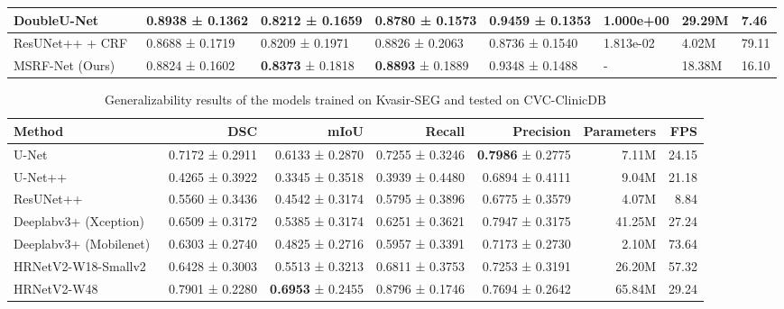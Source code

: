 \documentclass[journal,twoside,web]{IEEEtran}
\begin{document}
\begin{table*}[!t]
\begin{tabular}{@{}l|l|l|l|l|l|l|l@{}}
DoubleU-Net~\cite{jha2020doubleu} &{\textbf{0.8938}} ± 0.1362 & {0.8212} ± {0.1659} & 0.8780 ± {0.1573} & {0.9459} ± {0.1353} & 1.000e+00 & 29.29M & {7.46}  \\ \hline

ResUNet++ + CRF~\cite{jha2021comprehensive}& 0.8688 ± 0.1719 & 0.8209 ± 0.1971 & 0.8826 ± 0.2063 & 0.8736 ± 0.1540 & 1.813e-02 & 4.02M & 79.11 \\ \hline
MSRF-Net (Ours) & 0.8824 ± 0.1602 & \textbf{0.8373} ± 0.1818 &\textbf{0.8893} ± 0.1889 & 0.9348 ± 0.1488 & - & 18.38M & 16.10 \\ \hline   
\bottomrule
\end{tabular}
\vspace{-5mm}
\end{table*}

\begin{table*} [!t]
\centering
\scriptsize
\caption{Generalizability results of the models trained on Kvasir-SEG and tested on  CVC-ClinicDB}
\label{tab:generalizationkvasir}
\begin{tabular}{l|r|r|r|r|r|r}
\toprule
\textbf{Method} & \textbf{DSC} & \textbf{mIoU}& \textbf{Recall} & \textbf{Precision} & \textbf{Parameters} & \textbf{FPS} \\\hline
U-Net~\cite{ronneberger2015u} & 0.7172 ± 0.2911 & 0.6133 ± 0.2870 & 0.7255 ± 0.3246 & \textbf{0.7986} ± 0.2775 & 7.11M & 24.15\\ \hline

U-Net++~\cite{zhou2019unet++}  & 0.4265 ± 0.3922  & 0.3345 ± 0.3518 & 0.3939 ± 0.4480 & 0.6894 ± 0.4111   & 9.04M & 21.18     \\ \hline
ResUNet++~\cite{jha2019resunet++} & 0.5560 ± 0.3436 & 0.4542 ± 0.3174 & 0.5795 ± 0.3896 & 0.6775 ± 0.3579 & 4.07M & 8.84 \\ \hline

Deeplabv3+ (Xception)~\cite{chen2018encoder} & 0.6509 ± 0.3172 & 0.5385 ± 0.3174 & 0.6251 ± 0.3621 & 0.7947 ± 0.3175 & 41.25M &  27.24\\\hline

Deeplabv3+ (Mobilenet)~\cite{chen2018encoder} & 0.6303 ± 0.2740 & 0.4825 ± 0.2716 & 0.5957 ± 0.3391 & 0.7173 ± 0.2730 & 2.10M & 73.64\\ \hline

HRNetV2-W18-Smallv2~\cite{Wang_2020} & 0.6428 ± 0.3003 & 0.5513 ± 0.3213 & 0.6811 ± 0.3753 & 0.7253 ± 0.3191 & 26.20M & 57.32 \\ \hline 

HRNetV2-W48~\cite{Wang_2020} & 0.7901 ± 0.2280 & \textbf{0.6953} ± 0.2455  & 0.8796 ± 0.1746 & 0.7694 ± 0.2642 & 65.84M & 29.24\\ \hline


\end{tabular}
\end{table*}
\end{document}
